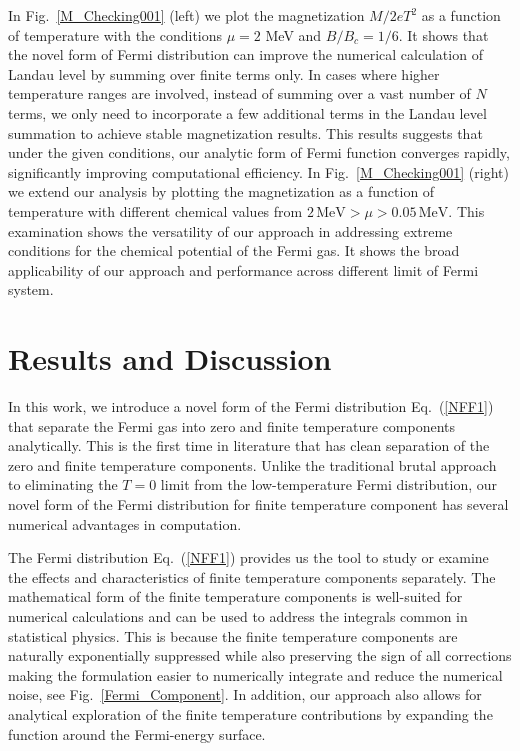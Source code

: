 \documentclass[sn-mathphys,Numbered]{sn-jnl}
\begin{document}
In Fig.~\ref{M_Checking001} (left) we plot the magnetization $M/2eT^2$ as a function of temperature with the conditions $\mu=2$ MeV and $B/B_c=1/6$. It shows that the novel form of Fermi distribution can improve the numerical calculation of Landau level by summing over finite terms only. In cases where higher temperature ranges are involved, instead of summing over a vast number of $N$ terms, we only need to incorporate a few additional terms in the Landau level summation to achieve stable magnetization results. This results suggests that under the given conditions, our analytic form of Fermi function converges rapidly, significantly improving computational efficiency. In Fig.~\ref{M_Checking001} (right) we extend our analysis by plotting the magnetization as a function of temperature with different chemical values from $2\,\mathrm{MeV}>\mu>0.05\,\mathrm{MeV}$. This examination shows the versatility of our approach in addressing extreme conditions for the chemical potential of the Fermi gas. It shows the broad applicability of our approach and performance across different limit of Fermi system.








\section{Results and Discussion}
\label{sec12}
In this work, we introduce a novel form of the Fermi distribution Eq.~(\ref{NFF1}) that separate the Fermi gas into zero and finite temperature components analytically. This is the first time in literature that has clean separation of the zero and finite temperature components. Unlike the traditional brutal approach to eliminating the $T=0$ limit from the low-temperature Fermi distribution, our novel form of the Fermi distribution for finite temperature component has several numerical advantages in computation. 

The Fermi distribution Eq.~(\ref{NFF1}) provides us the tool to study or examine the effects and characteristics of finite temperature components separately. The mathematical form of the finite temperature components is well-suited for numerical calculations and can be used to address the integrals common in statistical physics. This is because the finite temperature components are naturally exponentially suppressed while also preserving the sign of all corrections making the formulation easier to numerically integrate and reduce the numerical noise, see Fig.~\ref{Fermi_Component}. In addition, our approach also allows for analytical exploration of the finite temperature contributions by expanding the function around the Fermi-energy surface.
\end{document}
